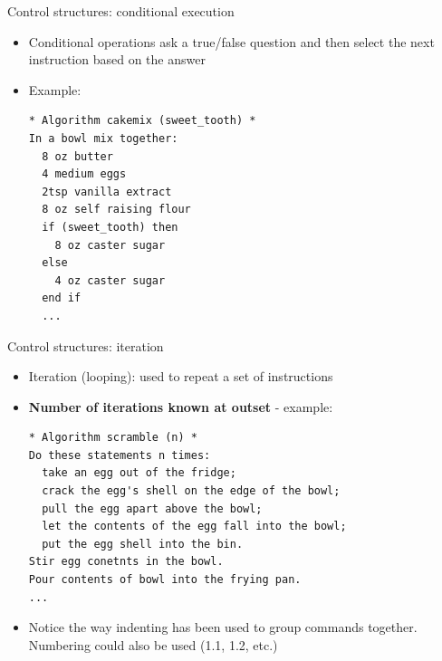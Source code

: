 \documentclass[ignorenonframetext,]{beamer}
\begin{document}
\begin{frame}[fragile]{Control structures: conditional execution}

\begin{itemize}[<+->]
\item
  Conditional operations ask a true/false question and then select the
  next instruction based on the answer
\item
  Example:

\begin{verbatim}
* Algorithm cakemix (sweet_tooth) *
In a bowl mix together:
  8 oz butter
  4 medium eggs
  2tsp vanilla extract
  8 oz self raising flour
  if (sweet_tooth) then
    8 oz caster sugar
  else
    4 oz caster sugar
  end if
  ...
\end{verbatim}
\end{itemize}

\end{frame}

\begin{frame}[fragile]{Control structures: iteration}

\begin{itemize}[<+->]
\item
  Iteration (looping): used to repeat a set of instructions
\item
  \textbf{Number of iterations known at outset} - example:

\begin{verbatim}
* Algorithm scramble (n) *
Do these statements n times:
  take an egg out of the fridge;
  crack the egg's shell on the edge of the bowl;
  pull the egg apart above the bowl;
  let the contents of the egg fall into the bowl;
  put the egg shell into the bin.
Stir egg conetnts in the bowl.
Pour contents of bowl into the frying pan.
...
\end{verbatim}
\item
  Notice the way indenting has been used to group commands together.
  Numbering could also be used (1.1, 1.2, etc.)
\end{itemize}

\end{frame}
\end{document}
